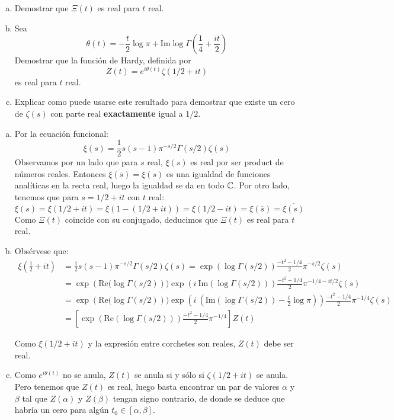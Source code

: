 \documentclass[twoside]{article}
\begin{document}
\begin{ejercicio}{4}
\begin{enumerate}[(a)]
\item Demostrar que $Ξ(t)$ es real para $t$ real.
\item Sea
\[ θ(t) = -\frac{t}{2} \log π + \text{Im} \log Γ\left(\frac{1}{4}+\frac{it}{2}\right)\]
Demostrar que la función de Hardy, definida por
\[ Z(t) = e^{iθ(t)} ζ(1/2+it) \]
es real para $t$ real.
\item Explicar como puede usarse este resultado para demostrar que existe un cero de $ζ(s)$ con parte real \textbf{exactamente} igual a $1/2$.
\end{enumerate}
\end{ejercicio}
\begin{solucion}
\begin{enumerate}[(a)]
\item Por la ecuación funcional:
\[ ξ(s) = \frac{1}{2}s(s-1)π^{-s/2}Γ(s/2)ζ(s) \]
Observamos por un lado que para $s$ real, $ξ(s)$ es real por ser product de números reales. Entonces $\overline{ξ(\overline{s})}=ξ(s)$ es una igualdad de funciones analíticas en la recta real, luego la igualdad se da en todo $\mathbb{C}$. Por otro lado, tenemos que para $s=1/2+it$ con $t$ real: 
\[ ξ(s)=ξ(1/2+it)=ξ(1-(1/2+it))=ξ(1/2-it) = ξ(\overline{s}) = \overline{ξ(s)} \]
Como $Ξ(t)$ coincide con su conjugado, deducimos que $Ξ(t)$ es real para $t$ real.
\item Obsérvese que:
\begin{align*}
ξ\left(\frac{1}{2}+it\right) & = \frac{1}{2}s(s-1)π^{-s/2}Γ(s/2)ζ(s) =
\exp\left(\log Γ(s/2)\right) \frac{-t^2-1/4}{2}π^{-s/2}ζ(s)\\
& = \exp\left(\text{Re}(\log Γ(s/2)\right))\exp\left(i\ \text{Im}(\log Γ(s/2))\right)\frac{-t^2-1/4}{2}π^{-1/4-it/2}ζ(s)\\
& = \exp\left(\text{Re}(\log Γ(s/2)\right))\exp\left(i\ \left(\text{Im}(\log Γ(s/2))-\frac{t}{2}\log π\right)\right)\frac{-t^2-1/4}{2}π^{-1/4}ζ(s)\\
& = \left[\exp(\text{Re}(\log Γ(s/2))) \frac{-t^2-1/4}{2} π^{-1/4}\right] Z(t)
\end{align*}

Como $ξ(1/2+it)$ y la expresión entre corchetes son reales, $Z(t)$ debe ser real.

\item Como $e^{i θ(t)}$ no se anula, $Z(t)$ se anula si y sólo si $ζ(1/2+it)$ se anula. Pero tenemos que $Z(t)$ es real, luego basta encontrar un par de valores $α$ y $β$ tal que $Z(α)$ y $Z(β)$ tengan signo contrario, de donde se deduce que habría un cero para algún $t_0 \in [α,β]$.
\end{enumerate}
\end{solucion}
\end{document}
